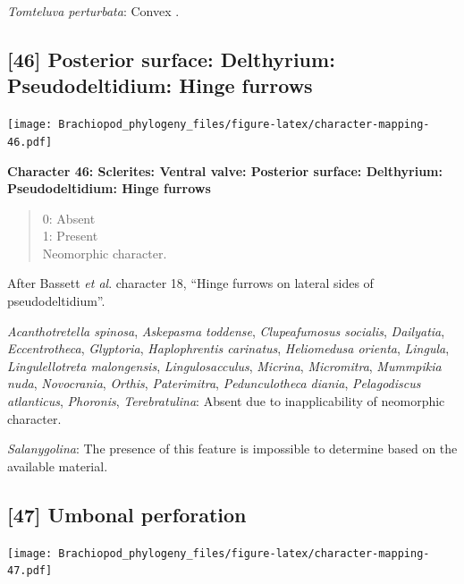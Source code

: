 \documentclass[openany]{book}
\theoremstyle{definition}
\theoremstyle{definition}
\theoremstyle{definition}
\theoremstyle{remark}
\begin{document}
\hypertarget{Tomteluva_perturbata-coding-45}{}
\emph{Tomteluva perturbata}: Convex \citep{Streng2016Anew}.

\subsection*{{[}46{]} Posterior surface: Delthyrium: Pseudodeltidium:
Hinge
furrows}\label{posterior-surface-delthyrium-pseudodeltidium-hinge-furrows}

\texttt{[image: Brachiopod\_phylogeny\_files/figure-latex/character-mapping-46.pdf]}

\textbf{Character 46: Sclerites: Ventral valve: Posterior surface:
Delthyrium: Pseudodeltidium: Hinge furrows}

\begin{quote}
0: Absent\\
1: Present\\
Neomorphic character.
\end{quote}

After Bassett \emph{et al}.
\citeyearpar{Bassett2001Functionalmorphology} character 18, ``Hinge
furrows on lateral sides of pseudodeltidium''.

\hypertarget{Acanthotretella_spinosa-coding-46}{}
\emph{Acanthotretella spinosa}, \emph{Askepasma toddense},
\emph{Clupeafumosus socialis}, \emph{Dailyatia}, \emph{Eccentrotheca},
\emph{Glyptoria}, \emph{Haplophrentis carinatus}, \emph{Heliomedusa
orienta}, \emph{Lingula}, \emph{Lingulellotreta malongensis},
\emph{Lingulosacculus}, \emph{Micrina}, \emph{Micromitra},
\emph{Mummpikia nuda}, \emph{Novocrania}, \emph{Orthis},
\emph{Paterimitra}, \emph{Pedunculotheca diania}, \emph{Pelagodiscus
atlanticus}, \emph{Phoronis}, \emph{Terebratulina}: Absent due to
inapplicability of neomorphic character.

\hypertarget{Salanygolina-coding-46}{}
\emph{Salanygolina}: The presence of this feature is impossible to
determine based on the available material.

\subsection*{{[}47{]} Umbonal perforation}\label{umbonal-perforation}

\texttt{[image: Brachiopod\_phylogeny\_files/figure-latex/character-mapping-47.pdf]}
\end{document}
